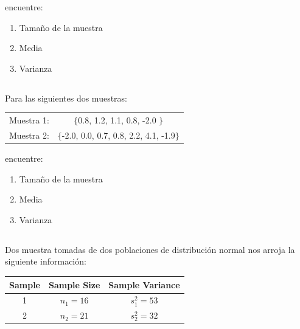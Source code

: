 \documentclass[11pt,letterpaper]{report}
\begin{document}
         encuentre:

         \begin{enumerate}
           \item Tamaño de la muestra
           \item Media
           \item Varianza
         \end{enumerate}
       \subsection{}%
         Para las siguientes dos muestras:
         \begin{table}[!h]
             \begin{tabular}{cc}
                 Muestra 1:&$\{$0.8, 1.2, 1.1, 0.8, -2.0 $\}$\\
                 Muestra 2:&$\{$-2.0, 0.0, 0.7, 0.8, 2.2, 4.1, -1.9$\}$
             \end{tabular}
         \end{table}

         encuentre:

         \begin{enumerate}
             \item Tamaño de la muestra
             \item Media
             \item Varianza
         \end{enumerate}
       \subsection{}%
         Dos muestra tomadas de dos poblaciones de distribución normal nos arroja la siguiente información:


         \begin{table}[!h]
             \begin{tabular}{ccc}
                 Sample &	Sample Size	&Sample Variance\\
                 \hline
                 1	 & $n_1 = 16$ & 	 $s^2_1 = 53$ \\
                 2	 & $n_2 = 21$ & 	 $s^2_2 = 32$  \\
             \end{tabular}
         \end{table}
\end{document}
